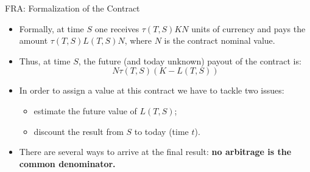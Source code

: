 \documentclass{beamer}
\begin{document}
\begin{frame}{FRA: Formalization of the Contract}
	\begin{itemize}
		\item<1-> Formally, at time $S$ one receives $\tau(T, S)KN$ units of currency and pays the amount $\tau(T,S)L(T,S)N$, where $N$ is the contract nominal value.
		\item<2-> Thus, at time $S$, the future (and today unknown) payout of the contract is: 
		\begin{equation}
			N\tau(T,S)(K-L(T,S))
			\label{eq:fra_payoff}
		\end{equation}
		\item<3-> In order to assign a value at this contract we have to tackle two issues:
		\begin{itemize}
			\item<4-> estimate the future value of $L(T, S)$;
			\item<5-> discount the result from $S$ to today (time $t$).
		\end{itemize}
		\item<6-> There are several ways to arrive at the final result: \textbf{no arbitrage is the common denominator.}
	\end{itemize}
\end{frame}

%	
%	
\end{document}
